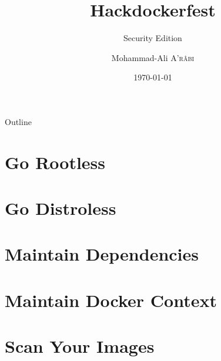\documentclass[10pt, compress]{beamer}
\title{Hackdockerfest}
\subtitle{Security Edition}
\date{\today}
\author{Mohammad-Ali \textsc{A'r\^abi}}
\institute{Docker Community}
\begin{document}
\maketitle

\begin{frame}{Outline}
    \tableofcontents
\end{frame}

\section{Go Rootless}

\section{Go Distroless}

\section{Maintain Dependencies}

\section{Maintain Docker Context}

\section{Scan Your Images}

\end{document}
